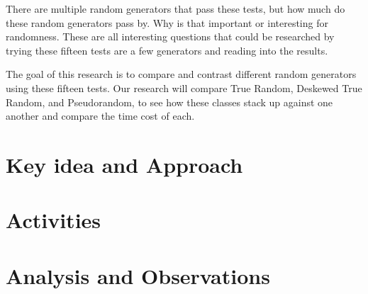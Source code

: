 \documentclass[11pt,letterpaper,conference]{IEEEtran}
\begin{document}
There are multiple random generators that pass these tests, but how much do these random
generators pass by. Why is that important or interesting for randomness. These are all interesting
questions that could be researched by trying these fifteen tests are a few generators and reading
into the results.

The goal of this research is to compare and contrast different random generators using these fifteen tests. Our research will compare True Random, Deskewed True Random, and Pseudorandom, to see how these classes stack up against one another and compare the time cost of each.

\section{Key idea and Approach}
\section{Activities}
\section{Analysis and Observations}

\end{document}
